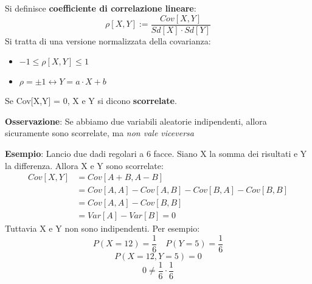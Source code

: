 \noindent Si definisce \textbf{coefficiente di correlazione lineare}: $$\rho[X,Y] := \dfrac{Cov[X,Y]}{Sd[X] \cdot Sd[Y]}$$ Si tratta di una versione normalizzata della covarianza: 
\begin{itemize}
    \item $-1 \leq \rho[X,Y] \leq 1$
    \item $\rho = \pm 1 \longleftrightarrow Y = a \cdot X + b$
\end{itemize}

\noindent Se Cov[X,Y] = 0, X e Y si dicono \textbf{scorrelate}. \newline

\noindent \textbf{Osservazione}:  Se abbiamo due variabili aleatorie indipendenti, allora sicuramente sono scorrelate, ma \textit{non vale viceversa}

\begin{tcolorbox}
    \textbf{Esempio}: Lancio due dadi regolari a 6 facce. Siano X la somma dei risultati e Y la differenza. Allora X e Y sono scorrelate:
    \begin{equation}
      \begin{aligned}
        Cov[X, Y] & = Cov[A+B, A-B]\\
          & = Cov[A,A] - Cov[A,B] - Cov[B,A] - Cov[B,B]\\
          & = Cov[A,A] - Cov[B,B] \\
          & = Var[A] - Var[B] = 0 
      \end{aligned}
    \end{equation}
    Tuttavia X e Y non sono indipendenti. Per esempio: $$P(X = 12) = \dfrac{1}{6} \quad P(Y = 5) = \dfrac{1}{6}$$ $$P(X = 12, Y = 5) = 0$$ $$ 0 \not= \dfrac{1}{6} \cdot \dfrac{1}{6}$$
\end{tcolorbox}

\begin{comment}
\section{Verso la Statistica}

Il modello fondamentale per la statistica è una \textbf{sucessione di variabili aleatorie indipendenti e identicamente distribuite (I.I.D.)} \newline

\noindent In un esperimento concreto si osserva una successione di dati numerici $x_1 \cdots x_N$ che interpretiamo come realizzazioni di variabile aleatorie $X_1 \cdots X_N$. \newline 

\noindent Ci poniamo il problema: a partire dai dati $x_1 \cdots x_N$ cosa possiamo dedurre sulla \textit{distribuzione comune} delle v.a. $X_i$?
\end{comment}






